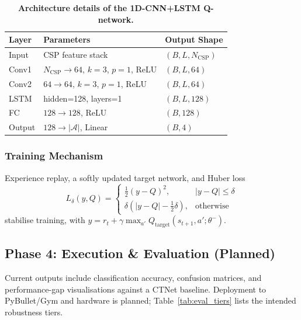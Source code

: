 \documentclass[twocolumn]{article}
\begin{document}
\begin{table}[t]
    \centering
    \caption{\textbf{Architecture details of the 1D-CNN+LSTM Q-network.}}
    \label{tab:net_arch}
    \setlength{\tabcolsep}{5pt}
    \renewcommand{\arraystretch}{1.12}
    \begin{tabular}{@{}p{} p{} p{}@{}}
        \toprule
        Layer & Parameters & Output Shape \\
        \midrule
        Input & CSP feature stack & $(B, L, N_{\text{CSP}})$ \\
        Conv1 & $N_{\text{CSP}}\!\rightarrow\!64$, $k=3$, $p=1$, ReLU & $(B, L, 64)$ \\
        Conv2 & $64\!\rightarrow\!64$, $k=3$, $p=1$, ReLU & $(B, L, 64)$ \\
        LSTM & hidden=128, layers=1 & $(B, L, 128)$ \\
        FC & $128\rightarrow128$, ReLU & $(B, 128)$ \\
        Output & $128\rightarrow|\mathcal{A}|$, Linear & $(B, 4)$ \\
        \bottomrule
    \end{tabular}
\end{table}

\subsubsection{Training Mechanism}
Experience replay, a softly updated target network, and Huber loss
\begin{equation}
    L_\delta(y,Q) =
    \begin{cases}
        \tfrac{1}{2}(y-Q)^2, & |y-Q| \le \delta \\
        \delta(|y-Q| - \tfrac{1}{2}\delta), & \text{otherwise}
    \end{cases}
\end{equation}
stabilise training, with $y = r_t + \gamma \max_{a'} Q_{\text{target}}(s_{t+1},a';\theta^-)$.

\subsection{Phase 4: Execution \& Evaluation (Planned)}

Current outputs include classification accuracy, confusion matrices, and performance-gap visualisations against a CTNet baseline. Deployment to PyBullet/Gym and hardware is planned; Table~\ref{tab:eval_tiers} lists the intended robustness tiers.
\end{document}
